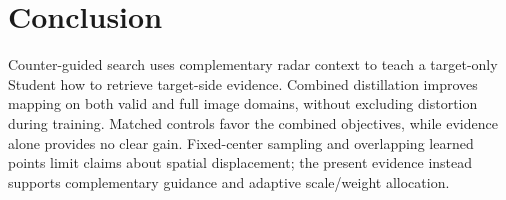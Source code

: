 \section{Conclusion}
\label{sec:conclusion}
Counter-guided search uses complementary radar context to teach a target-only Student how to retrieve target-side evidence. Combined distillation improves mapping on both valid and full image domains, without excluding distortion during training. Matched controls favor the combined objectives, while evidence alone provides no clear gain. Fixed-center sampling and overlapping learned points limit claims about spatial displacement; the present evidence instead supports complementary guidance and adaptive scale/weight allocation.
